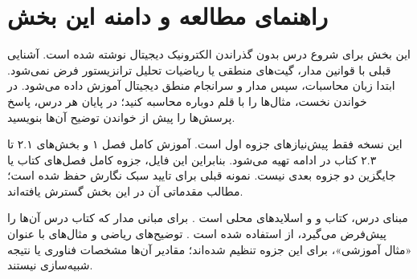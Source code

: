\documentclass[12pt,a4paper]{article}
\newcommand{\secnum}[1]{\mbox{\beginL#1\endL}}
\begin{document}
\MakeAssignmentCover
\section*{راهنمای مطالعه و دامنه این بخش}
این بخش برای شروع درس بدون گذراندن الکترونیک دیجیتال نوشته شده است.
آشنایی قبلی با قوانین مدار، گیت‌های منطقی یا ریاضیات تحلیل ترانزیستور فرض نمی‌شود.
ابتدا زبان محاسبات، سپس مدار و سرانجام منطق دیجیتال آموزش داده می‌شود.
در خواندن نخست، مثال‌ها را با قلم دوباره محاسبه کنید؛ در پایان هر درس، پاسخ پرسش‌ها
را پیش از خواندن توضیح آن‌ها بنویسید.

این نسخه فقط پیش‌نیازهای جزوه اول است. آموزش کامل فصل ۱ و بخش‌های
\secnum{۲.۱} تا \secnum{۲.۳} کتاب در ادامه تهیه می‌شود.
بنابراین این فایل، جزوه کامل فصل‌های کتاب یا جایگزین دو جزوه بعدی نیست.
نمونه قبلی برای تایید سبک نگارش حفظ شده است؛ مطالب مقدماتی آن در این بخش گسترش یافته‌اند.

مبنای درس، کتاب  و  و اسلایدهای محلی است
\cite{weste,intro,mos}. برای مبانی مدار که کتاب درس آن‌ها را پیش‌فرض می‌گیرد،
از  استفاده شده است
\cite{current,resistors,kirchhoff,capacitors}.
توضیح‌های ریاضی و مثال‌های با عنوان «مثال آموزشی»، برای این جزوه تنظیم شده‌اند؛
مقادیر آن‌ها مشخصات فناوری یا نتیجه شبیه‌سازی نیستند.
\end{document}
